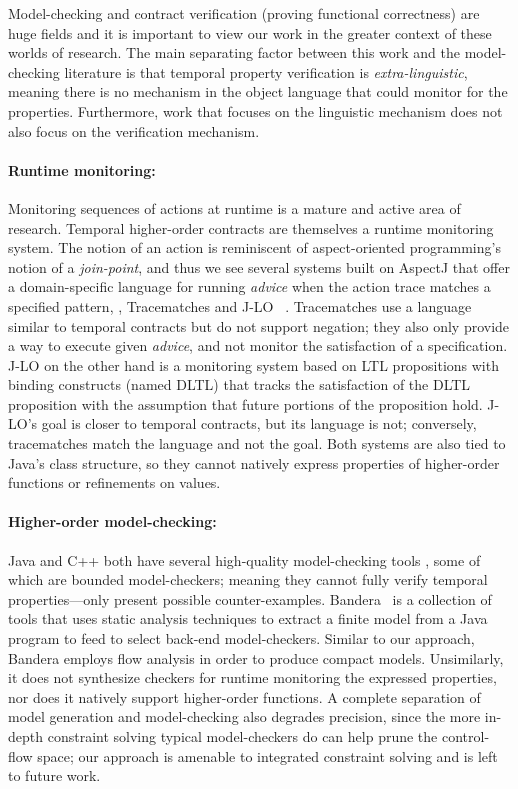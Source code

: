 Model-checking and contract verification (proving functional correctness) are huge fields and it is important to view our work in the greater context of these worlds of research.
%
The main separating factor between this work and the model-checking literature is that temporal property verification is \emph{extra-linguistic}, meaning there is no mechanism in the object language that could monitor for the properties.
%
Furthermore, work that focuses on the linguistic mechanism does not also focus on the verification mechanism.

\paragraph{Runtime monitoring:}
Monitoring sequences of actions at runtime is a mature and active area of research.
%
Temporal higher-order contracts are themselves a runtime monitoring system.
%
The notion of an action is reminiscent of aspect-oriented programming's notion of a \emph{join-point}, and thus we see several systems built on AspectJ \citep{ianjohnson:aspectj} that offer a domain-specific language for running \emph{advice} when the action trace matches a specified pattern, \eg, Tracematches \citep{ianjohnson:Allan05addingtrace} and J-LO ~\citep{ianjohnson:jlo}.
%
Tracematches use a language similar to temporal contracts but do not support negation; they also only provide a way to execute given \emph{advice}, and not monitor the satisfaction of a specification.
%
J-LO on the other hand is a monitoring system based on LTL propositions with binding constructs (named DLTL) that tracks the satisfaction of the DLTL proposition with the assumption that future portions of the proposition hold.
%
J-LO's goal is closer to temporal contracts, but its language is not; conversely, tracematches match the language and not the goal.
%
Both systems are also tied to Java's class structure, so they cannot natively express properties of higher-order functions or refinements on values.

\paragraph{Higher-order model-checking:}
Java and C++ both have several high-quality model-checking tools \citep{ianjohnson:bandera, ianjohnson:java-pathfinder, ianjohnson:LLBMC}, some of which are bounded model-checkers; meaning they cannot fully verify temporal properties---only present possible counter-examples.
%
Bandera~\citep{ianjohnson:bandera} is a collection of tools that uses static analysis techniques to extract a finite model from a Java program to feed to select back-end model-checkers.
%
Similar to our approach, Bandera employs flow analysis in order to produce compact models.
%
Unsimilarly, it does not synthesize checkers for runtime monitoring the expressed properties, nor does it natively support higher-order functions.
%
A complete separation of model generation and model-checking also degrades precision, since the more in-depth constraint solving typical model-checkers do can help prune the control-flow space; our approach is amenable to integrated constraint solving and is left to future work.

